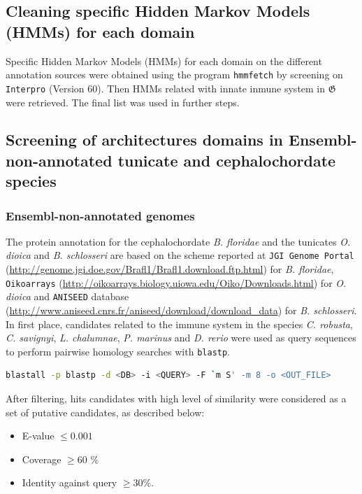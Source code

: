 \documentclass[11pt]{article}
\begin{document}
\subsection*{Cleaning specific Hidden Markov Models (HMMs) for each 
domain}
Specific Hidden Markov Models (HMMs) for each domain on the different 
annotation sources were obtained using the program \texttt{hmmfetch} by 
screening on \texttt{Interpro} (Version 60). Then HMMs related with innate 
inmune system in $\boldsymbol{\mathfrak{G}}$ were retrieved. The final list was 
used in further steps.

\subsection*{Screening of architectures domains in Ensembl-non-annotated 
tunicate and cephalochordate species}

\subsubsection*{Ensembl-non-annotated genomes}

The protein annotation for the cephalochordate \textsl{B. floridae} and 
the tunicates \textsl{O. dioica} and \textsl{B. schlosseri} are based on the 
scheme reported at \texttt{JGI Genome Portal} 
(\url{http://genome.jgi.doe.gov/Brafl1/Brafl1.download.ftp.html}) for \textsl{B. 
floridae}, \texttt{Oikoarrays} 
(\url{http://oikoarrays.biology.uiowa.edu/Oiko/Downloads.html}) for \textsl{O. 
dioica} and \texttt{ANISEED} database 
(\url{http://www.aniseed.cnrs.fr/aniseed/download/download_data}) for \textsl{B. 
schlosseri}. In first place, candidates related to the immune system in the 
species \textit{C. robusta}, \textsl{C. savignyi}, \textsl{L. chalumnae}, 
\textsl{P. marinus} and \textit{D. rerio} were used as query sequences to 
perform pairwise homology searches with \texttt{blastp}.

\begin{lstlisting}[language=bash, breaklines=true]
blastall -p blastp -d <DB> -i <QUERY> -F `m S' -m 8 -o <OUT_FILE>
\end{lstlisting}

After filtering, hits candidates with high level of similarity were 
considered as a set of putative candidates, as described below:

\begin{itemize}
\item E-value $\leq 0.001$
\item Coverage $\geq 60$ \%
\item Identity against query $\geq 30$\%.
\end{itemize}
\end{document}
